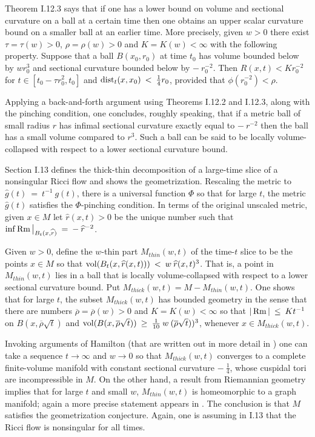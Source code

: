 Theorem I.12.3 says that if one has a lower bound on volume and sectional
curvature on a ball at a certain time then one obtains an upper scalar
curvature bound on a smaller ball at an earlier time.  More precisely,
given $w > 0$ there exist $\tau = \tau(w) > 0$, $\rho = \rho(w) > 0$ and
$K = K(w) < \infty$ with the following property.  Suppose that
a ball
$B(x_0, r_0)$ at time $t_0$ has volume bounded below by
$w r_0^3$ and sectional curvature bounded below by $- \: r_0^{-2}$. Then
$R(x,t) < K r_0^{-2}$ for
$t \in [t_0 - \tau r_0^2, t_0]$ and $\operatorname{dist}_t(x,x_0) \: < \: \frac14 r_0$,
provided that $\phi(r_0^{-2}) < \rho$.

Applying a back-and-forth argument using Theorems I.12.2 and I.12.3,
along with the pinching condition, one concludes, roughly speaking,
that if a metric ball of small radius $r$ has infimal sectional curvature
exactly equal to $- \: r^{-2}$ then the ball has a small volume
compared to $r^3$. Such a ball can be said to be locally
volume-collapsed with respect to a lower sectional curvature bound.

Section I.13 defines the thick-thin decomposition of a large-time slice
of
a nonsingular
Ricci flow and shows the geometrization.
Rescaling the metric to $\widehat{g}(t) \: = \: t^{-1} \: g(t)$,
there is a universal function $\Phi$ so that for large $t$, the metric
$\widehat{g}(t)$ satisfies the $\Phi$-pinching condition. In terms of the
original unscaled metric, given $x \in M$ let $\widehat{r}(x,t) > 0$ be the unique
number such that $\inf \operatorname{Rm} \big|_{B_t(x,\widehat{r})} \: = \: - \:
\widehat{r}^{-2}$.

Given $w > 0$, define the $w$-thin part
$M_{thin}(w,t)$ of the time-$t$ slice to be the points $x \in M$ so that
$\operatorname{vol}(B_t(x, \widehat{r}(x,t))) \: < \: w \: \widehat{r}(x,t)^3$.
That is, a point
in $M_{thin}(w,t)$ lies in a ball that is locally volume-collapsed
with respect to a lower sectional curvature bound. Put
$M_{thick}(w,t) = M - M_{thin}(w,t)$. One shows that for large $t$, the subset
$M_{thick}(w,t)$ has bounded geometry in the sense that there
are numbers $\overline{\rho} = \overline{\rho}(w) > 0$ and
$K = K(w) < \infty$ so that $|\operatorname{Rm}| \: \le \: K t^{-1}$ on
$B(x, \overline{\rho} \sqrt{t})$ and
$\operatorname{vol}(B(x, \overline{\rho} \sqrt{t})) \: \ge \: \frac{1}{10} \: w \: (\overline{\rho} \sqrt{t}))^3$,
whenever $x \in M_{thick}(w,t)$.

Invoking arguments of Hamilton (that are written out in more detail in
\cite{Perelman2}) one can take a sequence $t \rightarrow \infty$ and
$w \rightarrow 0$ so that $M_{thick}(w,t)$ converges to a complete finite-volume
manifold with constant sectional curvature $- \: \frac14$, whose cuspidal
tori are incompressible in $M$. On the other hand, a result from Riemannian
geometry implies that for large $t$ and small $w$, $M_{thin}(w,t)$ is homeomorphic to
a graph manifold; again a more precise statement appears in \cite{Perelman2}.
The conclusion is that $M$ satisfies the geometrization conjecture. Again, one is
assuming in
I.13
that the Ricci flow is nonsingular
for all times.
